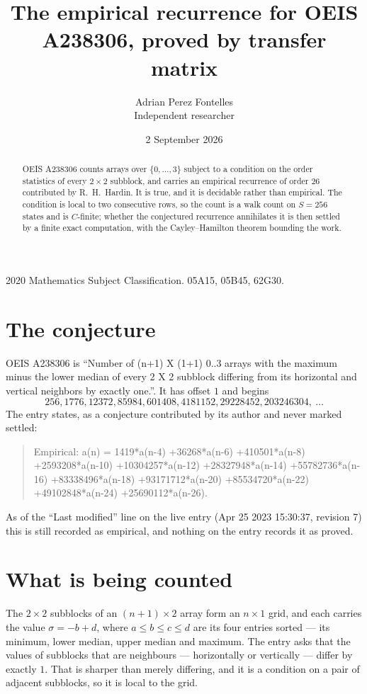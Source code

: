 \documentclass[11pt,a4paper]{article}
\title{The empirical recurrence for OEIS A238306, proved by transfer matrix}
\author{Adrian Perez Fontelles\\ \small Independent researcher}
\date{2 September 2026}
\theoremstyle{plain}
\theoremstyle{definition}
\begin{document}
\maketitle

\begin{abstract}
OEIS A238306 counts arrays over $\{0,\dots,3\}$ subject to a condition on the order
statistics of every $2\times2$ subblock, and carries an empirical recurrence of order
$26$ contributed by R.~H.~Hardin. It is true, and it is decidable rather than empirical.
The condition is local to two consecutive rows, so the count is a walk count on $S=256$
states and is $C$-finite; whether the conjectured recurrence annihilates it is then settled by
a finite exact computation, with the Cayley--Hamilton theorem bounding the work.
\end{abstract}

\noindent\small 2020 Mathematics Subject Classification. 05A15, 05B45, 62G30.\normalsize

\section{The conjecture}

OEIS A238306 is ``Number of (n+1) X (1+1) 0..3 arrays with the maximum minus the lower median of every 2 X 2 subblock differing from its horizontal and vertical neighbors by exactly one.''. It has offset $1$ and begins
\[
256, 1776, 12372, 85984, 601408, 4181152, 29228452, 203246304,\ \dots
\]
The entry states, as a conjecture contributed by its author and never marked settled:
\begin{quote}
Empirical: a(n) = 1419*a(n-4) +36268*a(n-6) +410501*a(n-8) +2593208*a(n-10) +10304257*a(n-12) +28327948*a(n-14) +55782736*a(n-16) +83338496*a(n-18) +93171712*a(n-20) +85534720*a(n-22) +49102848*a(n-24) +25690112*a(n-26).
\end{quote}
As of the ``Last modified'' line on the live entry (Apr 25 2023 15:30:37, revision 7) this is still
recorded as empirical, and nothing on the entry records it as proved.

\section{What is being counted}

The $2\times2$ subblocks of an $(n+1)\times2$ array form an
$n\times1$ grid, and each carries the value $\sigma=-b+d$, where $a\le b\le c\le d$ are its four entries sorted --- its minimum, lower median, upper median and maximum. The entry asks that the values of
subblocks that are neighbours --- horizontally or vertically --- differ by exactly $1$.
That is sharper than merely differing, and it is a condition on a pair of adjacent subblocks,
so it is local to the grid.
\end{document}
